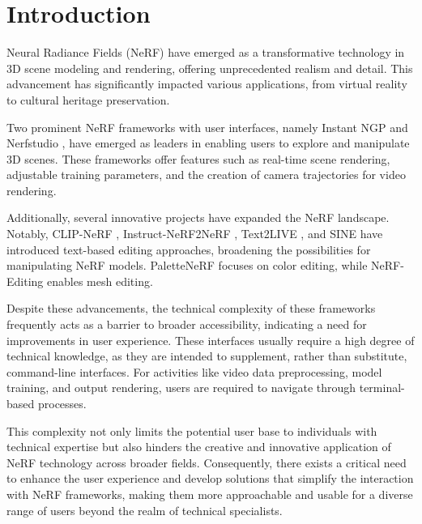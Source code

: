 %
\chapter{Introduction}
\label{sec:intro}


Neural Radiance Fields (NeRF) have emerged as a transformative technology in 3D scene modeling and rendering, offering unprecedented realism and detail. 
This advancement has significantly impacted various applications, from virtual reality to cultural heritage preservation. 

Two prominent NeRF frameworks with user interfaces, namely Instant NGP \cite{muller_instant_2022} and Nerfstudio \cite{tancik_nerfstudio_2023}, have emerged as leaders in enabling users to explore and manipulate 3D scenes. 
These frameworks offer features such as real-time scene rendering, adjustable training parameters, and the creation of camera trajectories for video rendering.

Additionally, several innovative projects have expanded the NeRF landscape. Notably, CLIP-NeRF \cite{wang_clip-nerf_2022}, Instruct-NeRF2NeRF \cite{haque_instruct-nerf2nerf_2023}, Text2LIVE \cite{bar-tal_text2live_2022}, and SINE \cite{bao_sine_2023} have introduced text-based editing approaches, broadening the possibilities for manipulating NeRF models. PaletteNeRF \cite{wu_palettenerf_2022} focuses on color editing, while NeRF-Editing \cite{yuan_nerf-editing_2022} enables mesh editing. 

Despite these advancements, the technical complexity of these frameworks frequently acts as a barrier to broader accessibility, indicating a need for improvements in user experience. 
These interfaces usually require a high degree of technical knowledge, as they are intended to supplement, rather than substitute, command-line interfaces.
For activities like video data preprocessing, model training, and output rendering, users are required to navigate through terminal-based processes.

This complexity not only limits the potential user base to individuals with technical expertise but also hinders the creative and innovative application of NeRF technology across broader fields. 
Consequently, there exists a critical need to enhance the user experience and develop solutions that simplify the interaction with NeRF frameworks, making them more approachable and usable for a diverse range of users beyond the realm of technical specialists.


